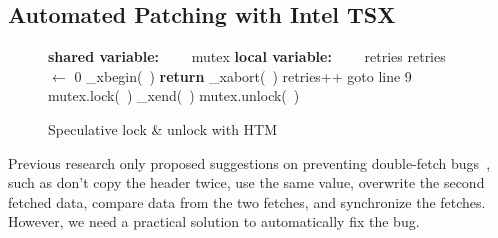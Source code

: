 \documentclass[10pt]{llncs}
\begin{document}
\subsection{Automated Patching with Intel TSX}
\label{design2}

\begin{figure}[htb!]
\begin{algorithmic}[1]
\State \textbf{shared variable:} 
\State ~~~~mutex
\State 
\State \textbf{local variable:} 
\State ~~~~retries
\State
{}
  \State retries $\gets$ 0
  \State \_xbegin(~)  \label{line:xbegin}
  \State \textbf{return}
  \Else 
  \State \_xabort(~)
  \EndIf
  \State retries++
  \State goto line 9
  \Else
  \State mutex.lock(~) 
  \EndIf
\EndProcedure
\State
{}
\State \_xend(~)
\Else 
\State mutex.unlock(~)
\EndIf
\EndProcedure
\end{algorithmic}
\caption{Speculative lock \& unlock with HTM }
\label{speculative-lock}
\end{figure}




Previous research only proposed suggestions on preventing double-fetch bugs~\cite{wang, precise}, such as don't copy the header twice, use the same value, overwrite the second fetched data, compare data from the two fetches, and synchronize the fetches. However, we need a practical solution to automatically fix the bug.

\end{document}
